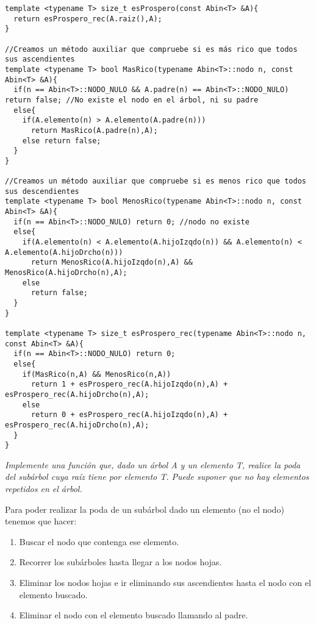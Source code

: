 \begin{verbatim}
template <typename T> size_t esProspero(const Abin<T> &A){
  return esProspero_rec(A.raiz(),A);
}

//Creamos un método auxiliar que compruebe si es más rico que todos sus ascendientes
template <typename T> bool MasRico(typename Abin<T>::nodo n, const Abin<T> &A){
  if(n == Abin<T>::NODO_NULO && A.padre(n) == Abin<T>::NODO_NULO) return false; //No existe el nodo en el árbol, ni su padre
  else{
    if(A.elemento(n) > A.elemento(A.padre(n)))
      return MasRico(A.padre(n),A);
    else return false;
  }
}

//Creamos un método auxiliar que compruebe si es menos rico que todos sus descendientes
template <typename T> bool MenosRico(typename Abin<T>::nodo n, const Abin<T> &A){
  if(n == Abin<T>::NODO_NULO) return 0; //nodo no existe
  else{
    if(A.elemento(n) < A.elemento(A.hijoIzqdo(n)) && A.elemento(n) < A.elemento(A.hijoDrcho(n)))
      return MenosRico(A.hijoIzqdo(n),A) && MenosRico(A.hijoDrcho(n),A);
    else
      return false;
  }
}

template <typename T> size_t esProspero_rec(typename Abin<T>::nodo n, const Abin<T> &A){
  if(n == Abin<T>::NODO_NULO) return 0;
  else{
    if(MasRico(n,A) && MenosRico(n,A))
      return 1 + esProspero_rec(A.hijoIzqdo(n),A) + esProspero_rec(A.hijoDrcho(n),A);
    else
      return 0 + esProspero_rec(A.hijoIzqdo(n),A) + esProspero_rec(A.hijoDrcho(n),A);
  }
}
\end{verbatim}

\textbf{\large{}}\textit{ Implemente una función que, dado un árbol A y un elemento T, realice la poda del subárbol cuya raíz tiene por elemento T. Puede suponer que no hay elementos repetidos en el árbol.}

Para poder realizar la poda de un subárbol dado un elemento (no el nodo) tenemos que hacer:
\begin{enumerate}
  \item Buscar el nodo que contenga ese elemento.
  \item Recorrer los subárboles hasta llegar a los nodos hojas.
  \item Eliminar los nodos hojas e ir eliminando sus ascendientes hasta el nodo con el elemento buscado.
  \item Eliminar el nodo con el elemento buscado llamando al padre.
\end{enumerate}

